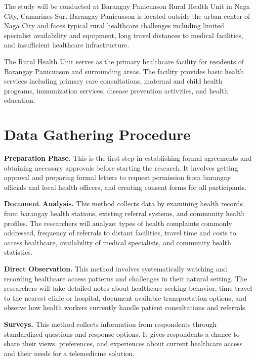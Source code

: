 \documentclass[12pt]{report}
\begin{document}
The study will be conducted at Barangay Panicuason Rural Health Unit in Naga
City, Camarines Sur. Barangay Panicuason is located outside the urban center
of Naga City and faces typical rural healthcare challenges including limited
specialist availability and equipment, long travel distances to medical
facilities, and insufficient healthcare infrastructure.

The Rural Health Unit serves as the primary healthcare facility for residents
of Barangay Panicuason and surrounding areas. The facility provides basic health
services including primary care consultations, maternal and child health
programs, immunization services, disease prevention activities, and health
education.

\section*{Data Gathering Procedure}

\noindent\textbf{Preparation Phase.} This is the first step in establishing formal
agreements and obtaining necessary approvals before starting the research. It
involves getting approval and preparing formal letters to request permission
from barangay officials and local health officers, and creating consent forms
for all participants.

\noindent\textbf{Document Analysis.} This method collects data by examining health
records from barangay health stations, existing referral systems, and community
health profiles. The researchers will analyze: types of health complaints
commonly addressed, frequency of referrals to distant facilities, travel time
and costs to access healthcare, availability of medical specialists, and
community health statistics.

\noindent\textbf{Direct Observation.} This method involves systematically watching and
recording healthcare access patterns and challenges in their natural setting.
The researchers will take detailed notes about healthcare-seeking behavior,
time travel to the nearest clinic or hospital, document available transportation
options, and observe how health workers currently handle patient consultations
and referrals.

\noindent\textbf{Surveys.} This method collects information from respondents through
standardized questions and response options. It gives respondents a chance to
share their views, preferences, and experiences about current healthcare access
and their needs for a telemedicine solution.
\end{document}
